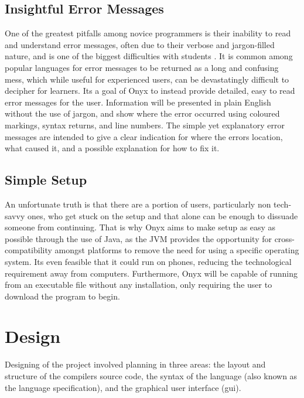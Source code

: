 \documentclass[
]{report}
\begin{document}
\section{Insightful Error Messages}
One of the greatest pitfalls among novice programmers is their inability
to read and understand error messages, often due to their verbose and
jargon-filled nature, and is one of the biggest difficulties with
students \cite{pedagogical-report}. It is common among popular languages for error
messages to be returned as a long and confusing mess, which while useful
for experienced users, can be devastatingly difficult to decipher for
learners. Its a goal of Onyx to instead provide detailed, easy to read
error messages for the user. Information will be presented in plain
English without the use of jargon, and show where the error occurred
using coloured markings, syntax returns, and line numbers. The simple
yet explanatory error messages are intended to give a clear indication
for where the errors location, what caused it, and a possible
explanation for how to fix it.

\section{Simple Setup}
An unfortunate truth is that there are a portion of users, particularly
non tech-savvy ones, who get stuck on the setup and that alone can be
enough to dissuade someone from continuing. That is why Onyx aims to
make setup as easy as possible through the use of Java, as the JVM
provides the opportunity for cross-compatibility amongst platforms to
remove the need for using a specific operating system. Its even feasible
that it could run on phones, reducing the technological requirement away
from computers. Furthermore, Onyx will be capable of running from an
executable file without any installation, only requiring the user to
download the program to begin.

\chapter{Design}
Designing of the project involved planning in three areas: the layout
and structure of the compilers source code, the syntax of the language
(also known as the language specification), and the graphical user
interface (\acrshort{gui}).
\end{document}
